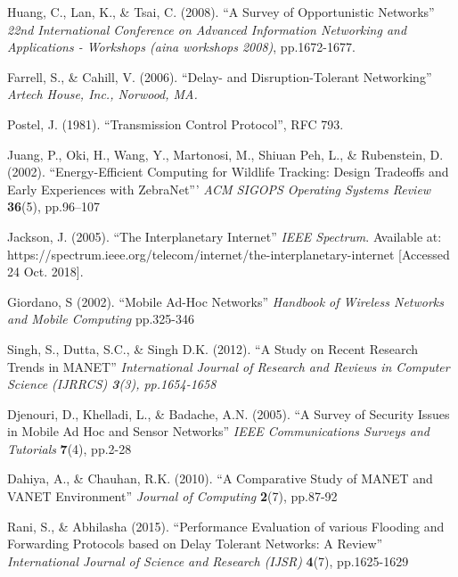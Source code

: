 \documentclass{article}
\begin{document}
\begin{thebibliography}{20}

Huang, C., Lan, K., \& Tsai, C. (2008).
``A Survey of Opportunistic Networks''
\textit{22nd International Conference on Advanced Information Networking and Applications - Workshops (aina workshops 2008)}, pp.1672-1677.

Farrell, S., \& Cahill, V. (2006).
``Delay- and Disruption-Tolerant Networking''
\textit{Artech House, Inc., Norwood, MA.}

Postel, J. (1981).
``Transmission Control Protocol'', RFC 793.

Juang, P., Oki, H., Wang, Y., Martonosi, M., Shiuan Peh, L., \& Rubenstein, D. (2002).
``Energy-Efficient Computing for Wildlife Tracking: Design Tradeoffs and Early Experiences with ZebraNet'''
\textit{ACM SIGOPS Operating Systems Review} \textbf{36}(5), pp.96–107

Jackson, J. (2005). 
``The Interplanetary Internet''
\textit{IEEE Spectrum}. Available at: https://spectrum.ieee.org/telecom/internet/the-interplanetary-internet [Accessed 24 Oct. 2018].

Giordano, S (2002).
``Mobile Ad-Hoc Networks''
\textit{Handbook of Wireless Networks and Mobile Computing} pp.325-346

Singh, S., Dutta, S.C., \& Singh D.K. (2012). 
``A Study on Recent Research Trends in MANET''
\textit{International Journal of Research and Reviews in Computer Science (IJRRCS) \textbf{3}(3), pp.1654-1658} 

Djenouri, D., Khelladi, L., \& Badache, A.N. (2005).
``A Survey of Security Issues in Mobile Ad Hoc and Sensor Networks''
\textit{IEEE Communications Surveys and Tutorials} \textbf{7}(4), pp.2-28

Dahiya, A., \& Chauhan, R.K. (2010).
``A Comparative Study of MANET and VANET Environment''
\textit{Journal of Computing} \textbf{2}(7), pp.87-92

Rani, S., \& Abhilasha (2015).
``Performance Evaluation of various Flooding and
Forwarding Protocols based on Delay Tolerant
Networks: A Review''
\textit{International Journal of Science and Research (IJSR)} \textbf{4}(7), pp.1625-1629


\end{thebibliography}
\end{document}
